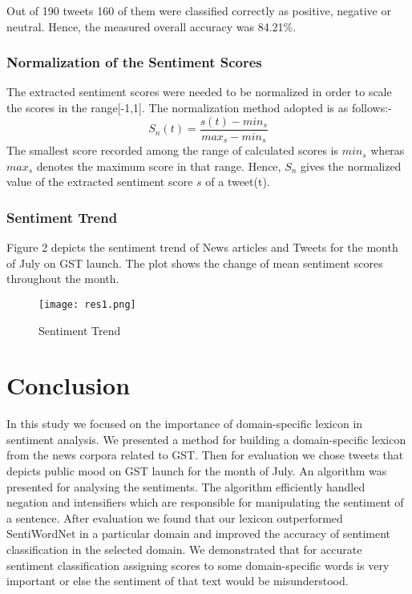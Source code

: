 \documentclass[conference]{IEEEtran}
\begin{document}
Out of 190 tweets 160 of them were classified correctly as positive, negative or neutral. Hence, the measured overall accuracy was 84.21\%. 
\subsubsection{Normalization of the Sentiment Scores}
The extracted sentiment scores were needed to be normalized in order to scale the scores in the range[-1,1]. The normalization method adopted {\cite{c17}} is as follows:-
\begin{equation}\label{Normalization of Sentiment Score}
S_{n}(t)=\frac{s(t)-min_{s}}{max_{s}-min_{s}} 
\end{equation}	
The smallest score recorded among the range of calculated scores is \textbf{$ min_{s} $} wheras \textbf{$ max_{s} $} denotes the maximum score in that range. Hence, $ S_{n}$ gives the normalized value of the extracted sentiment score $ s $  of a tweet(t).

\subsubsection{Sentiment Trend}
Figure 2 depicts the sentiment trend of News articles and Tweets for the month of July on GST launch. The plot shows the change of mean sentiment scores throughout the month.

\begin{figure}[h!]
	\texttt{[image: res1.png]}
	\caption{Sentiment Trend}
\end{figure}


\section{Conclusion}
In this study we focused on the importance of domain-specific lexicon in sentiment analysis. We presented a method for building a domain-specific lexicon from the news corpora related to GST. Then for evaluation we chose tweets that depicts public mood on GST launch for the month of July. An algorithm was presented for analysing the sentiments. The algorithm efficiently handled negation and intensifiers which are responsible for manipulating the sentiment of a sentence. After evaluation we found that our lexicon outperformed SentiWordNet in a particular domain and improved the accuracy of sentiment classification in the selected domain. We demonstrated that for accurate  sentiment classification assigning scores to some domain-specific  words is very important or else the sentiment of that text would be misunderstood.
\end{document}
